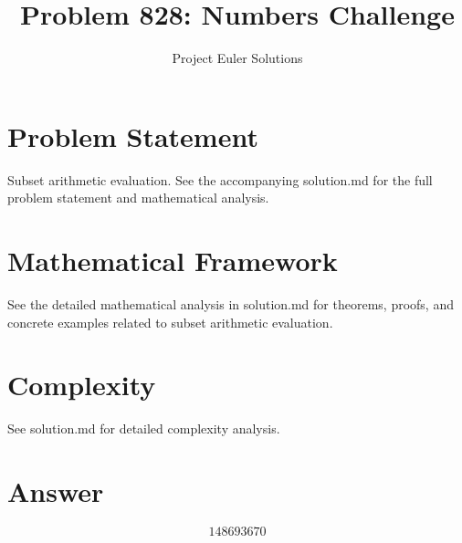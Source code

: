 \documentclass[11pt]{article}
\title{Problem 828: Numbers Challenge}
\author{Project Euler Solutions}
\date{}
\begin{document}
\maketitle

\section{Problem Statement}

Subset arithmetic evaluation. See the accompanying solution.md for the full problem statement and mathematical analysis.

\section{Mathematical Framework}

See the detailed mathematical analysis in solution.md for theorems, proofs, and concrete examples related to subset arithmetic evaluation.

\section{Complexity}

See solution.md for detailed complexity analysis.

\section{Answer}

\[
\boxed{148693670}
\]
\end{document}
